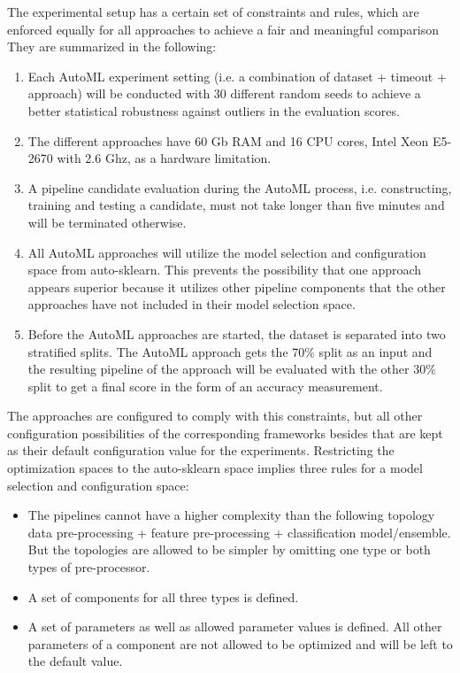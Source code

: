 The experimental setup has a certain set of constraints and rules, which are enforced equally for all approaches to achieve a fair and meaningful comparison
They are summarized in the following:
\begin{enumerate}
    \item Each AutoML experiment setting (i.e. a combination of dataset + timeout + approach) will be conducted with 30 different random seeds to achieve a better statistical robustness against outliers in the evaluation scores.
    \item The different approaches have 60 Gb RAM and 16 CPU cores, Intel Xeon E5-2670 with 2.6 Ghz, as a hardware limitation.
    \item A pipeline candidate evaluation during the AutoML process, i.e. constructing, training and testing a candidate, must not take longer than five minutes and will be terminated otherwise.
    \item All AutoML approaches will utilize the model selection and configuration space from auto-sklearn. This prevents the possibility that one approach appears superior because it utilizes other pipeline components that the other approaches have not included in their model selection space.
    \item Before the AutoML approaches are started, the dataset is separated into two stratified splits. The AutoML approach gets the 70\% split as an input and the resulting pipeline of the approach will be evaluated with the other 30\% split to get a final score in the form of an accuracy measurement.
\end{enumerate}
The approaches are configured to comply with this constraints, but all other configuration possibilities of the corresponding frameworks besides that are kept as their default configuration value for the experiments.\newline
Restricting the optimization spaces to the auto-sklearn space implies three rules for a model selection and configuration space:
\begin{itemize}
    \item The pipelines cannot have a higher complexity than the following topology data pre-processing + feature pre-processing + classification model/ensemble. But the topologies are allowed to be simpler by omitting one type or both types of pre-processor.
    \item A set of components for all three types is defined.
    \item A set of parameters as well as allowed parameter values is defined. All other parameters of a component are not allowed to be optimized and will be left to the default value.
\end{itemize}
